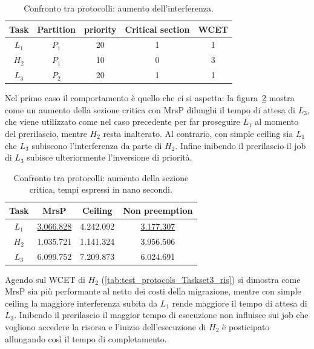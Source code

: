   \begin{table}
  \centering
  \begin{tabular}{ccccc}
  \hline\hline
    Task & Partition     & priority & Critical section & WCET  \\ \hline
    $L_1$ & $P_1$  & 20 & 1 & 1 \\
    $H_2$ & $P_1$  & 10 & 0 & 3 \\
    $L_3$ & $P_2$  & 20 & 1 & 1 \\
    \hline
    \end{tabular}
    \caption{Confronto tra protocolli: aumento dell'interferenza.}
  \label{tab:test_protocols_Taskset3}
  \end{table}

\noindent Nel primo caso il comportamento è quello che ci si aspetta: la figura~\ref{tab:test_protocols_Taskset2_ris} mostra come un aumento della sezione critica con MrsP dilunghi il tempo di attesa di $L_3$, che viene utilizzato come nel caso precedente per far proseguire $L_1$ al momento del prerilascio, mentre $H_2$ resta inalterato. Al contrario, con simple ceiling sia $L_1$ che $L_3$ subiscono l'interferenza da parte di $H_2$. Infine inibendo il prerilascio il job di $L_3$ subisce ulteriormente l'inversione di priorità.\\

\begin{table}
  \centering
  \begin{tabular}{cccc}
  \hline\hline
    Task & MrsP & Ceiling & Non preemption \\ \hline
    $L_1$ & \underline{3.066.828} & 4.242.092 & \underline{3.177.307} \\
    $H_2$ & 1.035.721 & 1.141.324 & 3.956.506 \\
    $L_3$ & 6.099.752 & 7.209.873 & 6.024.691 \\
    \hline
    \end{tabular}
    \caption{Confronto tra protocolli: aumento della sezione critica, tempi espressi in nano secondi.}
  \label{tab:test_protocols_Taskset2_ris}
  \end{table}

\noindent Agendo sul WCET di $H_2$ (\ref{tab:test_protocols_Taskset3_ris}) si dimostra come MrsP sia più performante al netto dei costi della migrazione, mentre con simple ceiling la maggiore interferenza subita da $L_1$ rende maggiore il tempo di attesa di $L_3$. Inibendo il prerilascio il maggior tempo di esecuzione non influisce sui job che vogliono accedere la risorsa e l'inizio dell'esecuzione di $H_2$ è posticipato allungando così il tempo di completamento.\\

